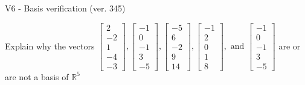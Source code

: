 \begin{exercise}
  \begin{exerciseTitle}V6 - Basis verification (ver. 345)\end{exerciseTitle}
  \begin{exerciseStatement}
    Explain why the vectors \(\left[\begin{array}{r}
2 \\
-2 \\
1 \\
-4 \\
-3
\end{array}\right] , \left[\begin{array}{r}
-1 \\
0 \\
-1 \\
3 \\
-5
\end{array}\right] , \left[\begin{array}{r}
-5 \\
6 \\
-2 \\
9 \\
14
\end{array}\right] , \left[\begin{array}{r}
-1 \\
2 \\
0 \\
1 \\
8
\end{array}\right] , \text{ and } \left[\begin{array}{r}
-1 \\
0 \\
-1 \\
3 \\
-5
\end{array}\right]\) are or are not a basis of \(\mathbb{R}^5\)	



\end{exerciseStatement}
\end{exercise}
